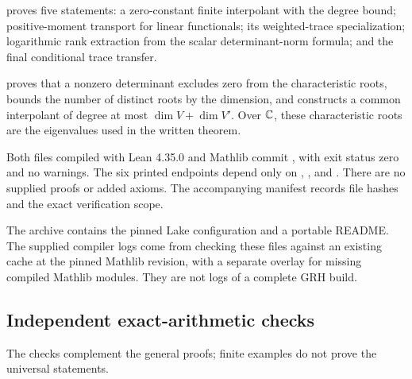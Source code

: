  proves five statements: a zero-constant
finite interpolant with the degree bound; positive-moment transport for linear
functionals; its weighted-trace specialization; logarithmic rank extraction
from the scalar determinant-norm formula; and the final conditional trace transfer.

 proves that a nonzero determinant excludes
zero from the characteristic roots, bounds the number of distinct roots by the
dimension, and constructs a common interpolant of degree at most
\(\dim V+\dim V'\). Over \(\mathbb C\), these characteristic roots are the eigenvalues
used in the written theorem.

Both files compiled with Lean 4.35.0 and Mathlib commit
, with exit status zero and no
warnings. The six printed endpoints depend only on
, , and .
There are no supplied  proofs or added axioms.
The accompanying manifest records file hashes and the exact verification scope.

The archive contains the pinned Lake configuration and a portable README.
The supplied compiler logs come from checking these files against an existing
cache at the pinned Mathlib revision, with a separate overlay for missing compiled
Mathlib modules. They are not logs of a complete GRH build.

\subsection{Independent exact-arithmetic checks}

The checks complement the general proofs; finite examples do not prove the
universal statements.

